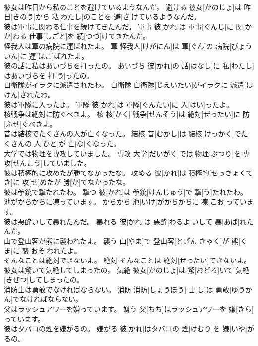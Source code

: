 \documentclass[8pt]{extreport}
\begin{document}
\begin{CJK}{UTF8}{min}
\\	彼女は昨日から私のことを避けているようなんだ。	避ける	彼女[かのじょ]は 昨日[きのう]から 私[わたし]のことを 避[さ]けているようなんだ。	
\\	彼は軍事に関わる仕事を続けてきたんだ。	軍事	彼[かれ]は 軍事[ぐんじ]に 関[かか]わる 仕事[しごと]を 続[つづ]けてきたんだ。	
\\	怪我人は軍の病院に運ばれたよ。	軍	怪我人[けがにん]は 軍[ぐん]の 病院[びょういん]に 運[はこ]ばれたよ。	
\\	彼の話に私はあいづちを打ったの。	あいづち	彼[かれ]の 話[はなし]に 私[わたし]はあいづちを 打[う]ったの。	
\\	自衛隊がイラクに派遣されたわ。	自衛隊	自衛隊[じえいたい]がイラクに 派遣[はけん]されたわ。	
\\	彼は軍隊に入ったよ。	軍隊	彼[かれ]は 軍隊[ぐんたい]に 入[はい]ったよ。	
\\	核戦争は絶対に防ぐべきよ。	核	核[かく] 戦争[せんそう]は 絶対[ぜったい]に 防[ふせ]ぐべきよ。	
\\	昔は結核でたくさんの人が亡くなった。	結核	昔[むかし]は 結核[けっかく]でたくさんの 人[ひと]が 亡[な]くなった。	
\\	大学では物理を専攻していました。	専攻	大学[だいがく]では 物理[ぶつり]を 専攻[せんこう]していました。	
\\	彼は積極的に攻めたが勝てなかったな。	攻める	彼[かれ]は 積極的[せっきょくてき]に 攻[せ]めたが 勝[か]てなかったな。	
\\	彼は拳銃で撃たれたわ。	撃つ	彼[かれ]は 拳銃[けんじゅう]で 撃[う]たれたわ。	
\\	池がかちかちに凍っています。	かちかち	池[いけ]がかちかちに 凍[こお]っています。	
\\	彼は悪酔いして暴れたんだ。	暴れる	彼[かれ]は 悪酔[わるよ]いして 暴[あば]れたんだ。	
\\	山で登山客が熊に襲われたよ。	襲う	山[やま]で 登山客[とざん きゃく]が 熊[くま]に 襲[おそ]われたよ。	
\\	そんなことは絶対できないよ。	絶対	そんなことは 絶対[ぜったい]できないよ。	
\\	彼女は驚いて気絶してしまったの。	気絶	彼女[かのじょ]は 驚[おどろ]いて 気絶[きぜつ]してしまったの。	
\\	消防士は勇敢でなければならない。	消防	消防[しょうぼう] 士[し]は 勇敢[ゆうかん]でなければならない。	
\\	父はラッシュアワーを嫌っています。	嫌う	父[ちち]はラッシュアワーを 嫌[きら]っています。	
\\	彼はタバコの煙を嫌がるの。	嫌がる	彼[かれ]はタバコの 煙[けむり]を 嫌[いや]がるの。	

\end{CJK}
\end{document}
